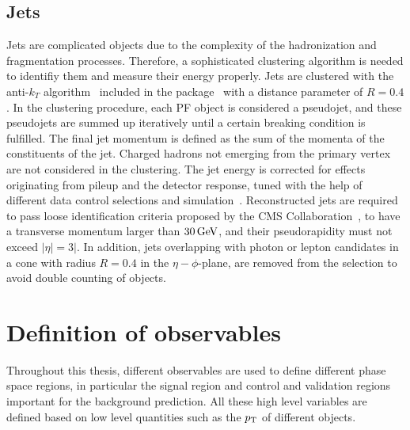 \subsection{Jets}
Jets are complicated objects due to the complexity of the hadronization and fragmentation processes. Therefore, a sophisticated clustering algorithm is needed to identifiy them and measure their energy properly. Jets are clustered with the anti-$k_T$ algorithm~\cite{AntiKT} included in the \FASTJET package~\cite{FastJet1,FastJet2} with a distance parameter of $R=0.4$. In the clustering procedure, each PF object is considered a pseudojet, and these pseudojets are summed up iteratively until a certain breaking condition is fulfilled. The final jet momentum is defined as the sum of the momenta of the constituents of the jet. Charged hadrons not emerging from the primary vertex are not considered in the clustering. The jet energy is corrected for effects originating from pileup and the detector response, tuned with the help of different data control selections and simulation~\cite{JEC}. Reconstructed jets are required to pass loose identification criteria proposed by the CMS Collaboration~\cite{JetID}, to have a transverse momentum larger than $30\,\text{Ge\hspace{-.08em}V}$, and their pseudorapidity must not exceed $|\eta|=3|$. In addition, jets overlapping with photon or lepton candidates in a cone with radius $R=0.4$ in the $\eta-\phi$-plane, are removed from the selection to avoid double counting of objects.


\section{Definition of observables}
Throughout this thesis, different observables are used to define different phase space regions, in particular the signal region and control and validation regions important for the background prediction. All these high level variables are defined based on low level quantities such as the $p_{\mathrm{T}}$ of different objects.


